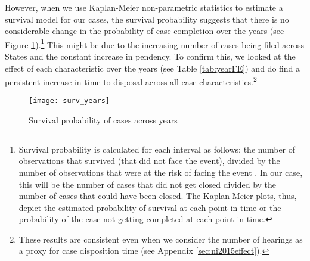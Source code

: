 \documentclass[12pt,a4paper]{article}
\begin{document}
However, when we use Kaplan-Meier non-parametric statistics to estimate a survival model for our cases, the survival probability suggests that there is no considerable change in the probability of case completion over the years (see Figure \ref{fig:yearSurvival}).\footnote{Survival probability is calculated for each interval as follows: the number of observations that survived (that did not face the event), divided by the number of observations that were at the risk of facing the event \autocite{rich2010practical}. In our case, this will be the number of cases that did not get closed divided by the number of cases that could have been closed. The Kaplan Meier plots, thus, depict the estimated probability of survival at each point in time or the probability of the case not getting completed at each point in time.} This might be due to the increasing number of cases being filed across States and the constant increase in pendency. To confirm this, we looked at the effect of each characteristic over the years (see Table \ref{tab:yearFE}) and do find a persistent increase in time to disposal across all case characteristics.\footnote{These results are consistent even when we consider the number of hearings as a proxy for case disposition time (see Appendix \ref{sec:ni2015effect}).}

\begin{figure}[ht]
\centering
\caption{Survival probability of cases across years}\label{fig:yearSurvival}
\texttt{[image: surv\_years]}
\end{figure}
\end{document}
